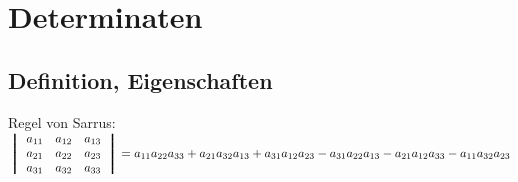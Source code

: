 \documentclass[10pt, a4paper, twocolumn]{scrartcl}
\begin{document}
\section{Determinaten}

\subsection{Definition, Eigenschaften}

Regel von Sarrus:\\
$
\left \bracevert
\begin{array}{ccc}
a_{11} & a_{12} & a_{13}\\
a_{21} & a_{22} & a_{23}\\
a_{31} & a_{32} & a_{33}
\end{array}
\right \bracevert
=a_{11}a_{22}a_{33}+a_{21}a_{32}a_{13}+a_{31}a_{12}a_{23}-a_{31}a_{22}a_{13}-a_{21}a_{12}a_{33}-a_{11}a_{32}a_{23}$\\\\
\end{document}
